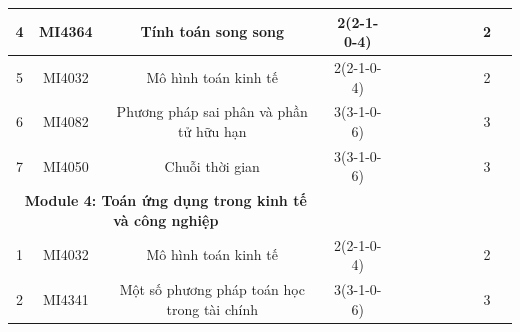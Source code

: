 \documentclass[12pt,a4paper]{report}
\begin{document}
\begin{landscape}
\begin{longtable}[c]{|c|c|c|c|c|c|c|c|c|c|c|c|}
        4                             & MI4364                          & Tính toán song song                                          & 2(2-1-0-4)                                                                           &             &             &             &             &             &             & 2           &             \\ \hline
        5                             & MI4032                          & Mô hình toán kinh tế                                         & 2(2-1-0-4)                                                                           &             &             &             &             &             &             & 2           &             \\ \hline
        6                             & MI4082                          & Phương pháp sai phân và phần tử hữu hạn                      & 3(3-1-0-6)                                                                           &             &             &             &             &             &             & 3           &             \\ \hline
        7                             & MI4050                          & Chuỗi thời gian                                              & 3(3-1-0-6)                                                                           &             &             &             &             &             &             & 3           &             \\ \hline
        \multicolumn{3}{|c|}{\textbf{Module 4: Toán ứng dụng trong kinh tế và công nghiệp}}                                            &                                                                                      &             &             &             &             &             &             &             &             \\ \hline
        1                             & MI4032                          & Mô hình toán kinh tế                                         & 2(2-1-0-4)                                                                           &             &             &             &             &             &             & 2           &             \\ \hline
        2                             & MI4341                          & Một số phương pháp toán học trong tài chính                  & 3(3-1-0-6)                                                                           &             &             &             &             &             &             & 3           &             \\ \hline

\end{longtable}
\end{landscape}
\end{document}
